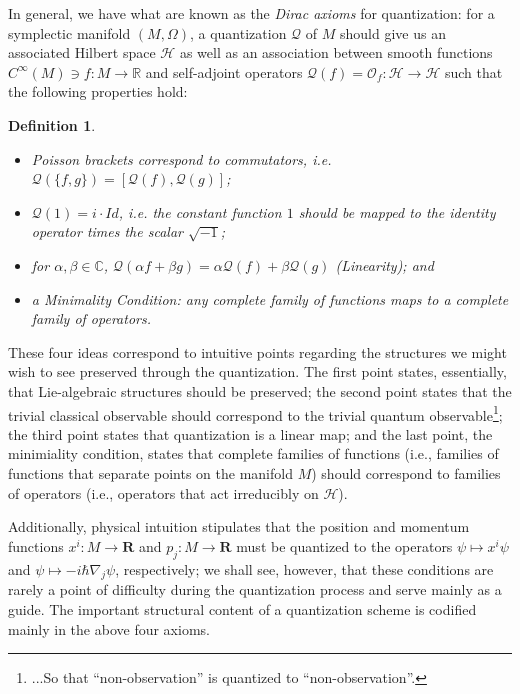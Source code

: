 \documentclass{tufte-handout}
\newtheorem{defn}{Definition}
\begin{document}
In general, we have what are known as the \emph{Dirac axioms} for quantization: for a symplectic manifold $(M,\Omega)$, a quantization $\mathcal{Q}$ of $M$ should give us an associated Hilbert space $\mathcal{H}$ as well as an association between smooth functions $C^\infty(M) \ni f: M \to \mathbb{R}$ and self-adjoint operators $\mathcal{Q}(f) = \mathcal{O}_f: \mathcal{H} \to \mathcal{H}$ such that the following properties hold:
\begin{defn}
\begin{itemize}
\item Poisson brackets correspond to commutators, i.e. $\mathcal{Q}(\{f,g\}) = [\mathcal{Q}(f),\mathcal{Q}(g)]$;
\item $\mathcal{Q}(1) = i \cdot Id$, i.e. the constant function $1$ should be mapped to the identity operator times the scalar $\sqrt{-1}$;
\item for $\alpha, \beta \in \mathbb{C}$, $\mathcal{Q}(\alpha f + \beta g) = \alpha \mathcal{Q}(f) + \beta \mathcal{Q}(g)$ \emph{(Linearity)}; and
\item a \emph{Minimality Condition}: any \emph{complete family} of functions maps to a \emph{complete family} of operators.
\end{itemize}
\end{defn}

These four ideas correspond to intuitive points regarding the structures we might wish to see preserved through the quantization. The first point states, essentially, that Lie-algebraic structures should be preserved; the second point states that the trivial classical observable should correspond to the trivial quantum observable\footnote{...So that ``non-observation'' is quantized to ``non-observation''.}; the third point states that quantization is a linear map; and the last point, the minimiality condition, states that complete families of functions (i.e., families of functions that separate points on the manifold $M$) should correspond to families of operators (i.e., operators that act irreducibly on $\mathcal{H}$).

Additionally, physical intuition stipulates that the position and momentum functions $x^i: M \to \mathbf{R}$ and $p_j: M \to \mathbf{R}$ must be quantized to the operators $\psi \mapsto x^i\psi$ and $\psi \mapsto -i\hbar\nabla_j\psi$, respectively; we shall see, however, that these conditions are rarely a point of difficulty during the quantization process and serve mainly as a guide. The important structural content of a quantization scheme is codified mainly in the above four axioms.
\end{document}
